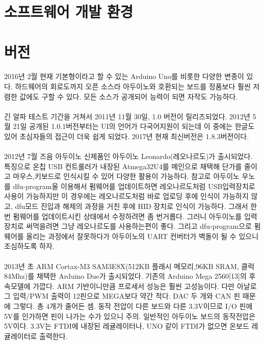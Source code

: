 \documentclass[12pt, a4paper, oneside]{book}
\let\stdsection\section
\renewcommand\section{\newpage\stdsection}
\begin{document}
	\section{ 소프트웨어 개발 환경}





	\section{ 버전}

\paragraph{}
2016년 2월 현재 기본형이라고 할 수 있는 Arduino Uno를 비롯한 다양한 변종이 있다. 
하드웨어의 회로도까지 오픈 소스라 아두이노와 호환되는 보드를 정품보다 훨씬 저렴한 값에도 구할 수 있다. 
모든 소스가 공개되어 능력이 되면 자작도 가능하다.

\paragraph{}
긴 알파 테스트 기간을 거쳐서 2011년 11월 30일, 1.0 버전이 릴리즈되었다. 
2012년 5월 21일 공개된 1.0.1버전부터는 UI의 언어가 다국어지원이 되는데 이 중에는 한글도 있어 초심자들의 접근이 더욱 쉽게 되었다. 
2017년 현재 최신버전은 1.8.3버전이다.

\paragraph{}
2012년 7월 즈음 아두이노 신제품인 아두이노 Leonardo(레오나르도)가 출시되었다. 
특징으로 온칩 USB 컨트롤러가 내장된 Atmega32U4를 메인으로 채택해 단가를 줄이고 마우스,키보드로 인식시킬 수 있어 다양한 활용이 가능하다. 
참고로 아두이노 우노를 dfu-program울 이용해서 펌웨어를 업데이트하면 레오나르도처럼 USB입력장치로 사용이 가능하지만 이 경우에는 레오나르도처럼 바로 업로딩 후에 인식이 가능하지 않고, dfu모드 진입과 해제의 과정을 거친 후에 HID 장치로 인식이 가능하다. 
그래서 한번 펌웨어를 업데이트시킨 상태에서 수정하려면 좀 번거롭다. 그러니 아두이노를 입력장치로 써먹을려면 그냥 레오나르도를 사용하는편이 좋다. 
그리고 dfu-program으로 펌웨어를 올리는 과정에서 잘못하다가 아두이노의 UART 컨버터가 벽돌이 될 수 있으니 조심하도록 하자.

\paragraph{}
2013년 초 ARM Cortax-M3 SAM3E8X(512KB 플래시 메모리,96KB SRAM, 클럭 84Mhz)를 채택한 Arduino Due가 출시되었다. 기존의 Arduino Mega 2560[13]의 후속모델에 가깝다. 
ARM 기반이니만큼 프로세서 성능은 훨씬 고성능이다. 
다만 아날로그 입력/PWM 출력이 12핀으로 MEGA보다 약간 적다. 
DAC 두 개와 CAN 핀 때문에 그렇다. 
총 4개가 줄어든 셈. 동작 전압이 다른 보드와 다른 3.3V이므로 I/O 핀에 5V를 인가하면 핀이 나가는 수가 있으니 주의. 일반적인 아두이노 보드의 동작전압은 5V이다. 
3.3V는 FTDI에 내장된 레귤레이터나, UNO 같이 FTDI가 없으면 온보드 레귤레이터로 출력한다.
\end{document}
